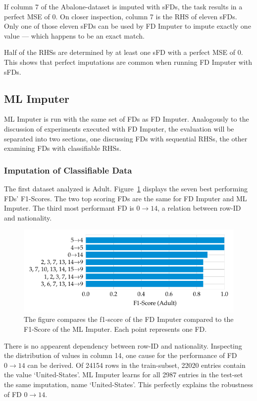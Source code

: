 If column 7 of the Abalone-dataset is imputed with sFDs, the task results in a perfect MSE of 0.
On closer inspection, column 7 is the RHS of eleven sFDs.
Only one of those eleven sFDs can be used by FD Imputer to impute exactly one value --- which happens to be an exact match.

Half of the RHSs are determined by at least one sFD with a perfect MSE of 0.
This shows that perfect imputations are common when running FD Imputer with sFDs.

\subsection{ML Imputer}
ML Imputer is run with the same set of FDs as FD Imputer.
Analogously to the discussion of experiments executed with FD Imputer, the evaluation will be separated into two sections, one discussing FDs with sequential RHSs, the other examining FDs with classifiable RHSs.

\subsubsection{Imputation of Classifiable Data}
The first dataset analyzed is Adult.
Figure~\ref{fig:f1_ml_adult} displays the seven best performing FDs' F1-Scores.
The two top scoring FDs are the same for FD Imputer and ML Imputer.
The third most performant FD is \( 0 \rightarrow 14\), a relation between row-ID and nationality.
\begin{figure}[ht]
     \centering
     \includegraphics[width=\textwidth]{../figures/adult/f1_ml_imputer.pdf}
     \caption{The figure compares the f1-score of the FD Imputer compared to the F1-Score of the ML Imputer. Each point represents one FD.}
     \label{fig:f1_ml_adult}
 \end{figure}
There is no appearent dependency between row-ID and nationality.
Inspecting the distribution of values in column 14, one cause for the performance of FD \( 0 \rightarrow 14 \) can be derived.
Of 24154 rows in the train-subset, 22020 entries contain the value `United-States'.
ML Imputer learns for all 2987 entries in the test-set the same imputation, name `United-States'.
This perfectly explains the robustness of FD \( 0 \rightarrow 14\).


